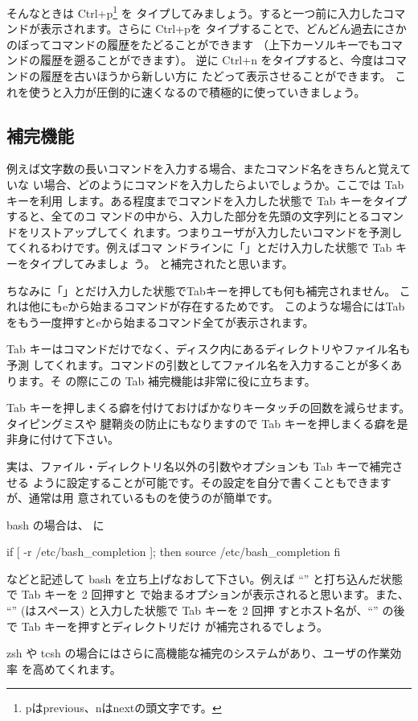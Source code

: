 \documentclass[platex]{jsarticle}
\begin{document}
 そんなときは Ctrl+p\footnote{pはprevious、nはnextの頭文字です。} を
 タイプしてみましょう。すると一つ前に入力したコマンドが表示されます。さらに Ctrl+pを
 タイプすることで、どんどん過去にさかのぼってコマンドの履歴をたどることができます
 （上下カーソルキーでもコマンドの履歴を遡ることができます）。
 逆に Ctrl+n をタイプすると、今度はコマンドの履歴を古いほうから新しい方に
 たどって表示させることができます。
 これを使うと入力が圧倒的に速くなるので積極的に使っていきましょう。


 \subsection{補完機能}
 例えば文字数の長いコマンドを入力する場合、またコマンド名をきちんと覚えていな
 い場合、どのようにコマンドを入力したらよいでしょうか。ここでは Tab キーを利用
 します。ある程度までコマンドを入力した状態で Tab キーをタイプすると、全てのコ
 マンドの中から、入力した部分を先頭の文字列にとるコマンドをリストアップしてく
 れます。つまりユーザが入力したいコマンドを予測してくれるわけです。例えばコマ
 ンドラインに「」とだけ入力した状態で Tab キーをタイプしてみましょ
 う。 と補完されたと思います。
 
 ちなみに「」とだけ入力した状態でTabキーを押しても何も補完されません。
 これは他にもeから始まるコマンドが存在するためです。
 このような場合にはTabをもう一度押すとeから始まるコマンド全てが表示されます。

 Tab キーはコマンドだけでなく、ディスク内にあるディレクトリやファイル名も予測
 してくれます。コマンドの引数としてファイル名を入力することが多くあります。そ
 の際にこの Tab 補完機能は非常に役に立ちます。

 Tab キーを押しまくる癖を付けておけばかなりキータッチの回数を減らせます。タイピングミスや
 腱鞘炎の防止にもなりますので Tab キーを押しまくる癖を是非身に付けて下さい。

 \begin{プチノート}
  実は、ファイル・ディレクトリ名以外の引数やオプションも Tab キーで補完させる
  ように設定することが可能です。その設定を自分で書くこともできますが、通常は用
  意されているものを使うのが簡単です。
  \vspace{1ex}

  bash の場合は、  に
  \begin{file}%
if [ -r /etc/bash_completion ]; then
  source /etc/bash_completion
fi\end{file}
  などと記述して bash を立ち上げなおして下さい。例えば
  ``'' と打ち込んだ状態で Tab キーを 2 回押すと
   で始まるオプションが表示されると思います。また、
  ``'' (\vs はスペース) と入力した状態で Tab キーを 2 回押
  すとホスト名が、``'' の後で Tab キーを押すとディレクトリだけ
  が補完されるでしょう。
  \vspace{1ex}

  zsh や tcsh の場合にはさらに高機能な補完のシステムがあり、ユーザの作業効率
  を高めてくれます。
 \end{プチノート}
\end{document}
